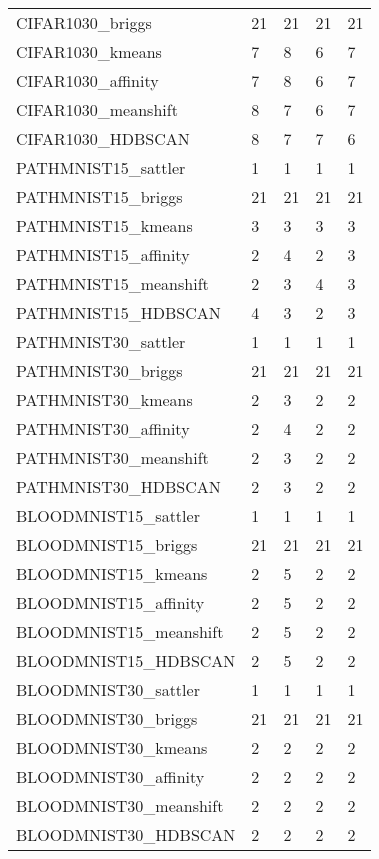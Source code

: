 \begin{tabular}{lllll}
CIFAR1030_briggs & 21 & 21 & 21 & 21 \\
CIFAR1030_kmeans & 7 & 8 & 6 & 7 \\
CIFAR1030_affinity & 7 & 8 & 6 & 7 \\
CIFAR1030_meanshift & 8 & 7 & 6 & 7 \\
CIFAR1030_HDBSCAN & 8 & 7 & 7 & 6 \\
PATHMNIST15_sattler & 1 & 1 & 1 & 1 \\
PATHMNIST15_briggs & 21 & 21 & 21 & 21 \\
PATHMNIST15_kmeans & 3 & 3 & 3 & 3 \\
PATHMNIST15_affinity & 2 & 4 & 2 & 3 \\
PATHMNIST15_meanshift & 2 & 3 & 4 & 3 \\
PATHMNIST15_HDBSCAN & 4 & 3 & 2 & 3 \\
PATHMNIST30_sattler & 1 & 1 & 1 & 1 \\
PATHMNIST30_briggs & 21 & 21 & 21 & 21 \\
PATHMNIST30_kmeans & 2 & 3 & 2 & 2 \\
PATHMNIST30_affinity & 2 & 4 & 2 & 2 \\
PATHMNIST30_meanshift & 2 & 3 & 2 & 2 \\
PATHMNIST30_HDBSCAN & 2 & 3 & 2 & 2 \\
BLOODMNIST15_sattler & 1 & 1 & 1 & 1 \\
BLOODMNIST15_briggs & 21 & 21 & 21 & 21 \\
BLOODMNIST15_kmeans & 2 & 5 & 2 & 2 \\
BLOODMNIST15_affinity & 2 & 5 & 2 & 2 \\
BLOODMNIST15_meanshift & 2 & 5 & 2 & 2 \\
BLOODMNIST15_HDBSCAN & 2 & 5 & 2 & 2 \\
BLOODMNIST30_sattler & 1 & 1 & 1 & 1 \\
BLOODMNIST30_briggs & 21 & 21 & 21 & 21 \\
BLOODMNIST30_kmeans & 2 & 2 & 2 & 2 \\
BLOODMNIST30_affinity & 2 & 2 & 2 & 2 \\
BLOODMNIST30_meanshift & 2 & 2 & 2 & 2 \\
BLOODMNIST30_HDBSCAN & 2 & 2 & 2 & 2 \\
\bottomrule
\end{tabular}
